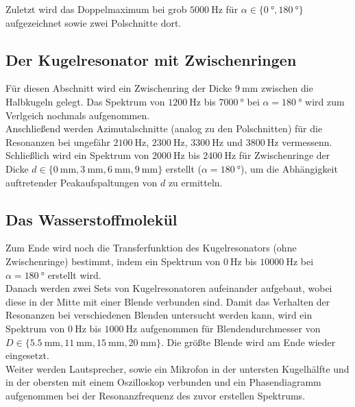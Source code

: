 \documentclass[../main.tex]{subfiles}
\begin{document}
    Zuletzt wird das Doppelmaximum bei grob $\SI{5000}{\hertz}$ für $\alpha\in\{\SI{0}{\degree},\SI{180}{\degree}\}$ aufgezeichnet sowie zwei Polschnitte dort.

\subsection{Der Kugelresonator mit Zwischenringen}
    Für diesen Abschnitt wird ein Zwischenring der Dicke $\SI{9}{\milli\metre}$ zwischen die Halbkugeln gelegt. Das Spektrum von $\SI{1200}{\hertz}$ bis $\SI{7000}{\degree}$ bei $\alpha=\SI{180}{\degree}$ wird zum Verlgeich nochmals aufgenommen.\\
    
    Anschließend werden Azimutalschnitte (analog zu den Polschnitten) für die Resonanzen bei ungefähr $\SI{2100}{\hertz}$, $\SI{2300}{\hertz}$, $\SI{3300}{\hertz}$ und $\SI{3800}{\hertz}$ vermessenn.\\

    Schließlich wird ein Spektrum von $\SI{2000}{\hertz}$ bis $\SI{2400}{\hertz}$ für Zwischenringe der Dicke $d\in\{\SI{0}{\milli\metre}, \SI{3}{\milli\metre}, \SI{6}{\milli\metre}, \SI{9}{\milli\metre}\}$ erstellt ($\alpha=\SI{180}{\degree}$), um die Abhängigkeit auftretender Peakaufspaltungen von $d$ zu ermitteln.

\subsection{Das Wasserstoffmolekül}
    Zum Ende wird noch die Transferfunktion des Kugelresonators (ohne Zwischenringe) bestimmt, indem ein Spektrum von $\SI{0}{\hertz}$ bis $\SI{10000}{\hertz}$ bei $\alpha=\SI{180}{\degree}$ erstellt wird.\\
    
    Danach werden zwei Sets von Kugelresonatoren aufeinander aufgebaut, wobei diese in der Mitte mit einer Blende verbunden sind. Damit das Verhalten der Resonanzen bei verschiedenen Blenden untersucht werden kann, wird ein Spektrum von $\SI{0}{\hertz}$ bis $\SI{1000}{\hertz}$ aufgenommen für Blendendurchmesser von $D\in\{\SI{5.5}{\milli\metre}, \SI{11}{\milli\metre}, \SI{15}{\milli\metre}, \SI{20}{\milli\metre}\}$. Die größte Blende wird am Ende wieder eingesetzt.\\
    
    Weiter werden Lautsprecher, sowie ein Mikrofon in der untersten Kugelhälfte und in der obersten mit einem Oszilloskop verbunden und ein Phasendiagramm aufgenommen bei der Resonanzfrequenz des zuvor erstellen Spektrums.\\
\end{document}
